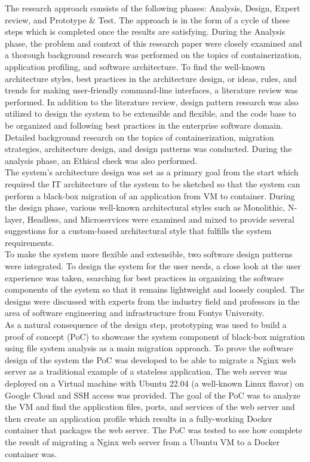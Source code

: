 \documentclass[twocolumn]{article}
\begin{document}
The research approach consists of the following phases: Analysis, Design, Expert review, and Prototype \& Test. The approach is in the form of a cycle of these steps which is completed once the results are satisfying. During the Analysis phase, the problem and context of this research paper were closely examined and a thorough background research was performed on the topics of containerization, application profiling, and software architecture. To find the well-known architecture styles, best practices in the architecture design, or ideas, rules, and trends for making user-friendly command-line interfaces, a literature review was performed. In addition to the literature review, design pattern research was also utilized to design the system to be extensible and flexible, and the code base to be organized and following best practices in the enterprise software domain. Detailed background research on the topics of containerization, migration strategies, architecture design, and design patterns was conducted. During the analysis phase, an Ethical check was also performed. \\

The system's architecture design was set as a primary goal from the start which required the IT architecture of the system to be sketched so that the system can perform a black-box migration of an application from VM to container. During the design phase, various well-known architectural styles such as Monolithic, N-layer, Headless, and Microservices were examined and mixed to provide several suggestions for a custom-based architectural style that fulfills the system requirements. \\

To make the system more flexible and extensible, two software design patterns were integrated. To design the system for the user needs, a close look at the user experience was taken, searching for best practices in organizing the software components of the system so that it remains lightweight and loosely coupled. The designs were discussed with experts from the industry field and professors in the area of software engineering and infrastructure from Fontys University. \\

As a natural consequence of the design step, prototyping was used to build a proof of concept (PoC) to showcase the system component of black-box migration using file system analysis as a main migration approach. To prove the software design of the system the PoC was developed to be able to migrate a Nginx web server as a traditional example of a stateless application. The web server was deployed on a Virtual machine with Ubuntu 22.04 (a well-known Linux flavor) on Google Cloud and SSH access was provided. The goal of the PoC was to analyze the VM and find the application files, ports, and services of the web server and then create an application profile which results in a fully-working Docker container that packages the web server. The PoC was tested to see how complete the result of migrating a Nginx web server from a Ubuntu VM to a Docker container was. \\
\end{document}
